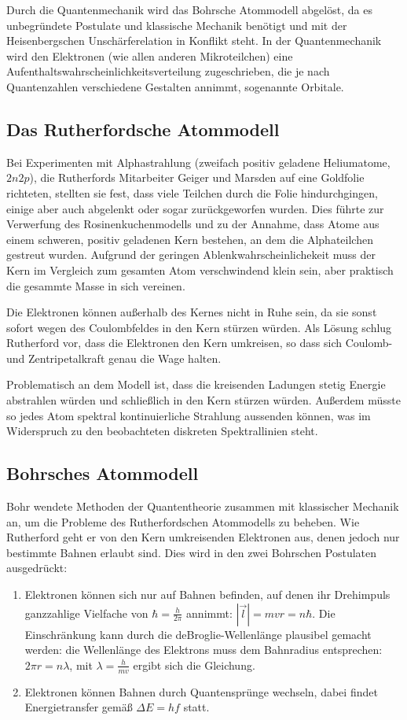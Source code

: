 \documentclass[a4paper]{scrartcl}
\begin{document}
Durch die Quantenmechanik wird das Bohrsche Atommodell abgelöst, da es unbegründete Postulate und klassische Mechanik benötigt und mit der Heisenbergschen Unschärferelation in Konflikt steht. In der Quantenmechanik wird den Elektronen (wie allen anderen Mikroteilchen) eine Aufenthaltswahrscheinlichkeitsverteilung zugeschrieben, die je nach Quantenzahlen verschiedene Gestalten annimmt, sogenannte Orbitale.

\subsection{Das Rutherfordsche Atommodell}
Bei Experimenten mit Alphastrahlung (zweifach positiv geladene Heliumatome, $2n2p$), die Rutherfords Mitarbeiter Geiger und Marsden auf eine Goldfolie richteten, stellten sie fest, dass viele Teilchen durch die Folie hindurchgingen, einige aber auch abgelenkt oder sogar zurückgeworfen wurden. Dies führte zur Verwerfung des Rosinenkuchenmodells und zu der Annahme, dass Atome aus einem schweren, positiv geladenen Kern bestehen, an dem die Alphateilchen gestreut wurden. Aufgrund der geringen Ablenkwahrscheinlichekeit muss der Kern im Vergleich zum gesamten Atom verschwindend klein sein, aber praktisch die gesammte Masse in sich vereinen.

Die Elektronen können außerhalb des Kernes nicht in Ruhe sein, da sie sonst sofort wegen des Coulombfeldes in den Kern stürzen würden. Als Lösung schlug Rutherford vor, dass die Elektronen den Kern umkreisen, so dass sich Coulomb- und Zentripetalkraft genau die Wage halten.

Problematisch an dem Modell ist, dass die kreisenden Ladungen stetig Energie abstrahlen würden und schließlich in den Kern stürzen würden. Außerdem müsste so jedes Atom spektral kontinuierliche Strahlung aussenden können, was im Widerspruch zu den beobachteten diskreten Spektrallinien steht.

\subsection{Bohrsches Atommodell}
Bohr wendete Methoden der Quantentheorie zusammen mit klassischer Mechanik an, um die Probleme des Rutherfordschen Atommodells zu beheben. Wie Rutherford geht er von den Kern umkreisenden Elektronen aus, denen jedoch nur bestimmte Bahnen erlaubt sind. Dies wird in den zwei Bohrschen Postulaten ausgedrückt:
\begin{enumerate}[noitemsep]
  \item Elektronen können sich nur auf Bahnen befinden, auf denen ihr Drehimpuls ganzzahlige Vielfache von $\hbar = \frac{h}{2\pi}$ annimmt: $|\vec l| = mvr = n\hbar$. Die Einschränkung kann durch die deBroglie-Wellenlänge plausibel gemacht werden: die Wellenlänge des Elektrons muss dem Bahnradius entsprechen: $2\pi r = n\lambda$, mit $\lambda = \frac{h}{mv}$ ergibt sich die Gleichung.
  \item Elektronen können Bahnen durch Quantensprünge wechseln, dabei findet Energietransfer gemäß $\Delta E = hf$ statt.
\end{enumerate}
\end{document}
